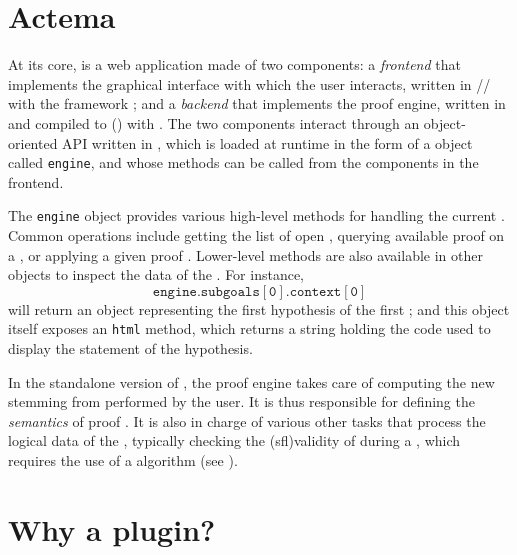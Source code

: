 \section{Actema}

\AP
At its core,  is a web application made of two components: a
\emph{frontend} that implements the graphical interface with which the user
interacts, written in // with the 
framework \cite{Vuejs}; and a \emph{backend} that implements the proof engine,
written in  and compiled to  () with
 . The two components
interact through an object-oriented API written in , which is loaded
at runtime in the form of a  object called \texttt{engine}, and whose
methods can be called from the  components in the frontend.

The \texttt{engine} object provides various high-level methods for handling the
current \emph{}. Common operations include getting the list of open
, querying available proof  on a , or applying a given
proof . Lower-level methods are also available in other objects to inspect
the data of the . For instance,
$$\mathtt{engine.subgoals[0].context[0]}$$ will return an object representing
the first hypothesis of the first ; and this object itself exposes
an \texttt{html} method, which returns a string holding the  code used to
display the statement of the hypothesis.

In the standalone version of , the proof engine takes care of
computing the new  stemming from  performed by the user. It
is thus responsible for defining the \emph{semantics} of proof . It is
also in charge of various other tasks that process the logical data of the
, typically checking the \kl(sfl){validity} of 
during a  , which requires the use of a  algorithm
(see ).

\section{Why a plugin?}

